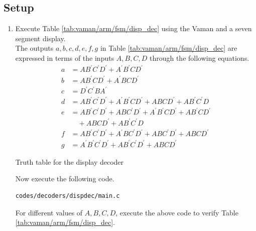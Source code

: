 \documentclass[journal,12pt,twocolumn]{IEEEtran}
\renewcommand\thesection{\arabic{section}}
\renewcommand\thesubsection{\thesection.\arabic{subsection}}
\begin{document}
\subsection{Setup}
\renewcommand{\theequation}{\theenumi}
\renewcommand{\thefigure}{\theenumi}
\begin{enumerate}[label=\thesubsection.\arabic*.,ref=\thesubsection.\theenumi]



\item Execute Table  \ref{tab:vaman/arm/fsm/disp_dec} using the Vaman and a seven segment display. 
\\
\solution The outputs $a,b,c,d,e,f,g$ in Table  \ref{tab:vaman/arm/fsm/disp_dec}  are expressed in terms of the inputs  $A,B,C,D$ through the following
equations. 
%
\begin{align}
\label{eq:vaman/arm/fsm/disp_a}
a &= AB^{\prime}C^{\prime}D^{\prime}+A^{\prime}B^{\prime}CD^{\prime}
\\
\label{eq:vaman/arm/fsm/disp_b}
b &= AB^{\prime}CD^{\prime}+A^{\prime}BCD^{\prime}
\\
\label{eq:vaman/arm/fsm/disp_c}
c &= {D}^{\prime}{C}^{\prime}B{A}^{\prime}
\\
d &= AB^{\prime}C^{\prime}D^{\prime}+A^{\prime}B^{\prime}CD^{\prime}+ABCD^{\prime}+AB^{\prime}C^{\prime}D
\label{eq:vaman/arm/fsm/disp_d}
\\
e &= AB^{\prime}C^{\prime}D^{\prime}+ABC^{\prime}D^{\prime}+A^{\prime}B^{\prime}CD^{\prime}+AB^{\prime}CD^{\prime}
\nonumber \\
&\quad +ABCD^{\prime}+AB^{\prime}C^{\prime}D
\label{eq:vaman/arm/fsm/disp_e}
\\
f &= AB^{\prime}C^{\prime}D^{\prime}+A^{\prime}BC^{\prime}D^{\prime}+ABC^{\prime}D^{\prime}+ABCD^{\prime}
\label{eq:vaman/arm/fsm/disp_f}
\\
g &= A^{\prime}B^{\prime}C^{\prime}D^{\prime}+AB^{\prime}C^{\prime}D^{\prime}+ABCD^{\prime}
\label{eq:vaman/arm/fsm/disp_g}
\end{align}
\begin{table}
\centering

\caption{Truth table for the display decoder}
\label{tab:vaman/arm/fsm/disp_dec}
\end{table}
%
Now execute the following code.  
\begin{lstlisting}
codes/decoders/dispdec/main.c
\end{lstlisting}
For different values of $A,B,C,D$, execute the above code to verify Table \ref{tab:vaman/arm/fsm/disp_dec}.


\end{enumerate}
\end{document}
